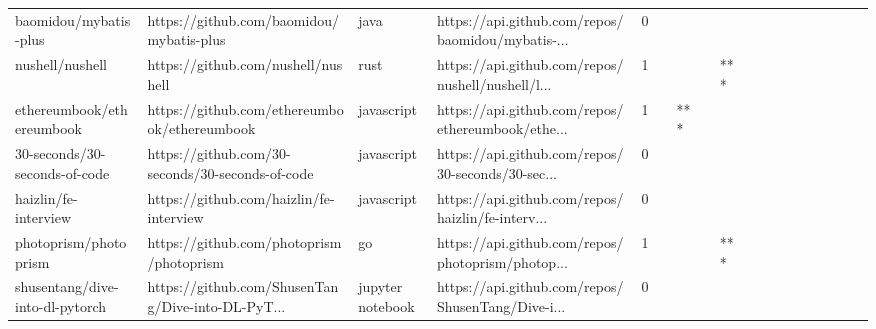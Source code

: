 \begin{tabular}{llllrlllllllllllll}
baomidou/mybatis-plus                              &           https://github.com/baomidou/mybatis-plus &              java &  https://api.github.com/repos/baomidou/mybatis-... &       0 &         &        &           &                &                 &        &           &           &          &          &       &              &          \\
nushell/nushell                                    &                 https://github.com/nushell/nushell &              rust &  https://api.github.com/repos/nushell/nushell/l... &       1 &         &        &           &            *** &                 &        &           &           &          &          &       &              &          \\
ethereumbook/ethereumbook                          &       https://github.com/ethereumbook/ethereumbook &        javascript &  https://api.github.com/repos/ethereumbook/ethe... &       1 &         &    *** &           &                &                 &        &           &           &          &          &       &              &          \\
30-seconds/30-seconds-of-code                      &   https://github.com/30-seconds/30-seconds-of-code &        javascript &  https://api.github.com/repos/30-seconds/30-sec... &       0 &         &        &           &                &                 &        &           &           &          &          &       &              &          \\
haizlin/fe-interview                               &            https://github.com/haizlin/fe-interview &        javascript &  https://api.github.com/repos/haizlin/fe-interv... &       0 &         &        &           &                &                 &        &           &           &          &          &       &              &          \\
photoprism/photoprism                              &           https://github.com/photoprism/photoprism &                go &  https://api.github.com/repos/photoprism/photop... &       1 &         &        &           &            *** &                 &        &           &           &          &          &       &              &          \\
shusentang/dive-into-dl-pytorch                    &  https://github.com/ShusenTang/Dive-into-DL-PyT... &  jupyter notebook &  https://api.github.com/repos/ShusenTang/Dive-i... &       0 &         &        &           &                &                 &        &           &           &          &          &       &              &          \\

\end{tabular}
